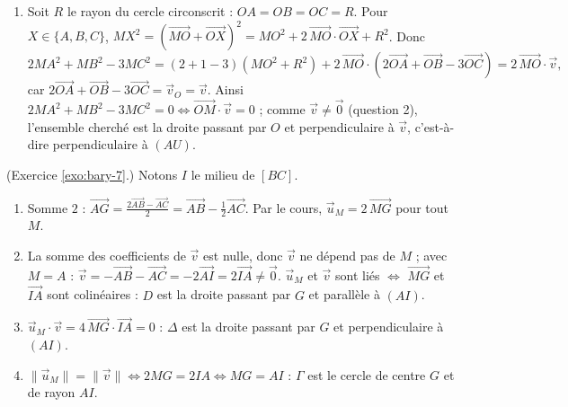 \begin{corrige}
\begin{sol}
\begin{enumerate}
      $\overrightarrow{UA} = \frac{1}{2}\vec{v}$ et $\overrightarrow{UP} = \overrightarrow{UA} + \overrightarrow{AP} = \frac{3}{2}\vec{v}$, d'o\`u $\overrightarrow{UP} = 3\,\overrightarrow{UA}$.
      $\overrightarrow{PB} = \overrightarrow{PA} + \overrightarrow{AB} = -\overrightarrow{AB} + 3\overrightarrow{AC} + \overrightarrow{AB} = 3\,\overrightarrow{AC}$.
\item Soit $R$ le rayon du cercle circonscrit : $OA = OB = OC = R$. Pour $X \in \{A,B,C\}$,
      $MX^2 = \left(\overrightarrow{MO} + \overrightarrow{OX}\right)^2 = MO^2 + 2\,\overrightarrow{MO}\cdot\overrightarrow{OX} + R^2$. Donc
      \[
      2MA^2 + MB^2 - 3MC^2 = (2+1-3)(MO^2 + R^2) + 2\,\overrightarrow{MO}\cdot\left(2\overrightarrow{OA} + \overrightarrow{OB} - 3\overrightarrow{OC}\right)
      = 2\,\overrightarrow{MO}\cdot\vec{v},
      \]
      car $2\overrightarrow{OA} + \overrightarrow{OB} - 3\overrightarrow{OC} = \vec{v}_O = \vec{v}$.
      Ainsi $2MA^2 + MB^2 - 3MC^2 = 0 \iff \overrightarrow{OM}\cdot\vec{v} = 0$ ; comme $\vec{v} \neq \vec{0}$ (question 2),
      l'ensemble cherch\'e est la droite passant par $O$ et perpendiculaire \`a $\vec{v}$, c'est-\`a-dire perpendiculaire \`a $(AU)$.
\end{enumerate}
\end{sol}
%
\begin{sol} (Exercice \ref{exo:bary-7}.)
Notons $I$ le milieu de $[BC]$.
\begin{enumerate}
\item Somme $2$ : $\overrightarrow{AG} = \frac{2\overrightarrow{AB} - \overrightarrow{AC}}{2} = \overrightarrow{AB} - \frac{1}{2}\overrightarrow{AC}$.
      Par le cours, $\vec{u}_M = 2\,\overrightarrow{MG}$ pour tout $M$.
\item La somme des coefficients de $\vec{v}$ est nulle, donc $\vec{v}$ ne d\'epend pas de $M$ ; avec $M = A$ :
      $\vec{v} = -\overrightarrow{AB} - \overrightarrow{AC} = -2\overrightarrow{AI} = 2\overrightarrow{IA} \neq \vec{0}$.
      $\vec{u}_M$ et $\vec{v}$ sont li\'es $\iff$ $\overrightarrow{MG}$ et $\overrightarrow{IA}$ sont colin\'eaires :
      $D$ est la droite passant par $G$ et parall\`ele \`a $(AI)$.
\item $\vec{u}_M\cdot\vec{v} = 4\,\overrightarrow{MG}\cdot\overrightarrow{IA} = 0$ : $\Delta$ est la droite passant par $G$ et perpendiculaire \`a $(AI)$.
\item $\|\vec{u}_M\| = \|\vec{v}\| \iff 2MG = 2IA \iff MG = AI$ : $\Gamma$ est le cercle de centre $G$ et de rayon $AI$.
\end{enumerate}

\end{sol}
\end{corrige}
